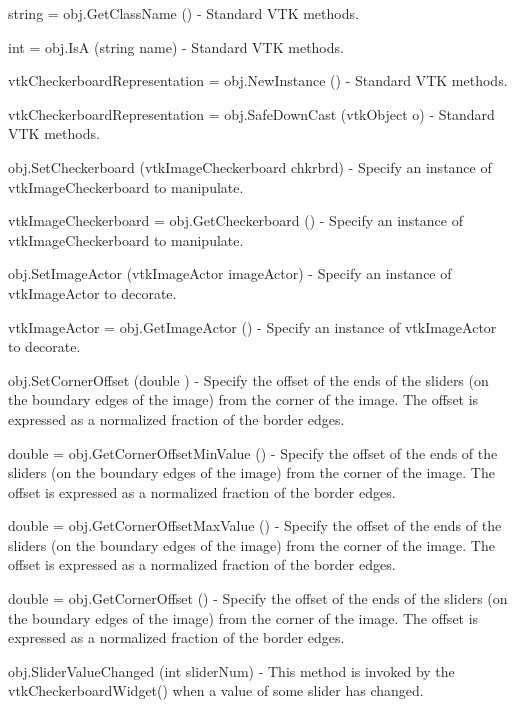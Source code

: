 \begin{DoxyItemize}
\item {\ttfamily string = obj.\-Get\-Class\-Name ()} -\/ Standard V\-T\-K methods.  
\item {\ttfamily int = obj.\-Is\-A (string name)} -\/ Standard V\-T\-K methods.  
\item {\ttfamily vtk\-Checkerboard\-Representation = obj.\-New\-Instance ()} -\/ Standard V\-T\-K methods.  
\item {\ttfamily vtk\-Checkerboard\-Representation = obj.\-Safe\-Down\-Cast (vtk\-Object o)} -\/ Standard V\-T\-K methods.  
\item {\ttfamily obj.\-Set\-Checkerboard (vtk\-Image\-Checkerboard chkrbrd)} -\/ Specify an instance of vtk\-Image\-Checkerboard to manipulate.  
\item {\ttfamily vtk\-Image\-Checkerboard = obj.\-Get\-Checkerboard ()} -\/ Specify an instance of vtk\-Image\-Checkerboard to manipulate.  
\item {\ttfamily obj.\-Set\-Image\-Actor (vtk\-Image\-Actor image\-Actor)} -\/ Specify an instance of vtk\-Image\-Actor to decorate.  
\item {\ttfamily vtk\-Image\-Actor = obj.\-Get\-Image\-Actor ()} -\/ Specify an instance of vtk\-Image\-Actor to decorate.  
\item {\ttfamily obj.\-Set\-Corner\-Offset (double )} -\/ Specify the offset of the ends of the sliders (on the boundary edges of the image) from the corner of the image. The offset is expressed as a normalized fraction of the border edges.  
\item {\ttfamily double = obj.\-Get\-Corner\-Offset\-Min\-Value ()} -\/ Specify the offset of the ends of the sliders (on the boundary edges of the image) from the corner of the image. The offset is expressed as a normalized fraction of the border edges.  
\item {\ttfamily double = obj.\-Get\-Corner\-Offset\-Max\-Value ()} -\/ Specify the offset of the ends of the sliders (on the boundary edges of the image) from the corner of the image. The offset is expressed as a normalized fraction of the border edges.  
\item {\ttfamily double = obj.\-Get\-Corner\-Offset ()} -\/ Specify the offset of the ends of the sliders (on the boundary edges of the image) from the corner of the image. The offset is expressed as a normalized fraction of the border edges.  
\item {\ttfamily obj.\-Slider\-Value\-Changed (int slider\-Num)} -\/ This method is invoked by the vtk\-Checkerboard\-Widget() when a value of some slider has changed.  

\end{DoxyItemize}
